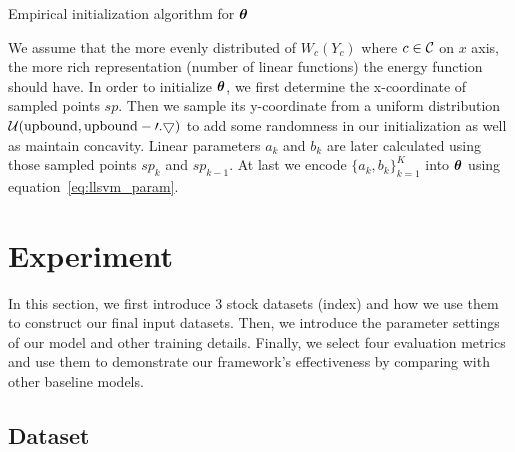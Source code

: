 \documentclass[sigconf, anonymous, review]{acmart}
\begin{document}
\begin{algorithm}[ht]
  \begin{algorithmic}[1]
       
    \ENDIF
    \ENDFOR
     
  \end{algorithmic}
  \caption{\label{alg:init_theta} Empirical initialization
    algorithm for $\boldsymbol{\theta}$}
\end{algorithm}

We assume that the more evenly distributed of $W_c(Y_c)$ where
$c\in\cal C$ on $x$ axis, the more rich representation (number of
linear functions) the energy function should have. In order to
initialize $\boldsymbol{\theta}$, we first determine the x-coordinate of
sampled points $sp$. Then we sample its y-coordinate from a
uniform distribution $\cal U(\text{upbound},\text{upbound}-0.5)$ to add some
randomness in our initialization as well as maintain concavity.
Linear parameters $a_k$ and $b_k$ are later calculated using
those sampled points $sp_k$ and $sp_{k-1}$. At last we encode
$\{a_k,b_k\}_{k=1}^K$ into $\boldsymbol{\theta}$ using
equation~\eqref{eq:llsvm_param}.



\section{Experiment}
\label{sec:exp}

In this section, we first introduce 3 stock datasets (index) and
how we use them to construct our final input datasets. Then, we
introduce the parameter settings of our model and other training
details. Finally, we select four evaluation metrics and use them
to demonstrate our framework's effectiveness by comparing with
other baseline models.

\subsection{Dataset}
\label{sec:dataset}
\end{document}
